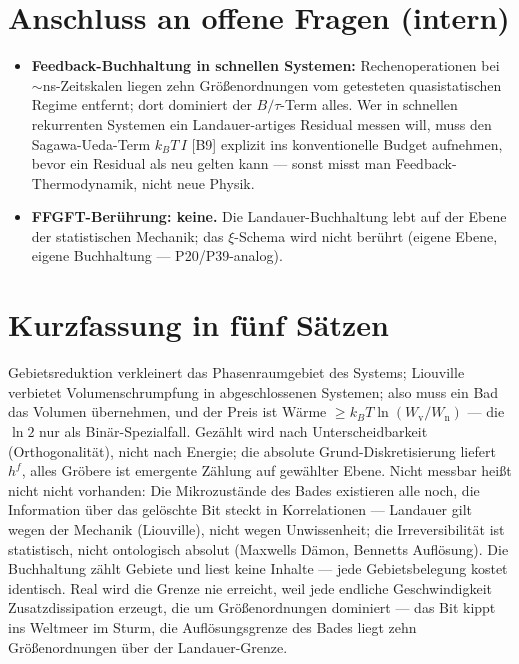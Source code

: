 \section{Anschluss an offene Fragen (intern)}

\begin{itemize}[leftmargin=1.4em,itemsep=0.35em]
  \item \textbf{Feedback-Buchhaltung in schnellen Systemen:} Rechenoperationen bei
        ${\sim}$ns-Zeitskalen liegen zehn Größenordnungen vom getesteten
        quasistatischen Regime entfernt; dort dominiert der $B/\tau$-Term alles.
        Wer in schnellen rekurrenten Systemen ein Landauer-artiges Residual messen
        will, muss den Sagawa-Ueda-Term $k_B T\,I$ [B9] explizit ins konventionelle
        Budget aufnehmen, bevor ein Residual als neu gelten kann --- sonst misst
        man Feedback-Thermodynamik, nicht neue Physik.
  \item \textbf{FFGFT-Berührung: keine.} Die Landauer-Buchhaltung lebt auf der
        Ebene der statistischen Mechanik; das $\xi$-Schema wird nicht berührt
        (eigene Ebene, eigene Buchhaltung --- P20/P39-analog).
\end{itemize}

\section{Kurzfassung in fünf Sätzen}

Gebietsreduktion verkleinert das Phasenraumgebiet des Systems; Liouville verbietet
Volumenschrumpfung in abgeschlossenen Systemen; also muss ein Bad das Volumen
übernehmen, und der Preis ist Wärme
$\ge k_B T \ln(W_{\text{v}}/W_{\text{n}})$ --- die $\ln 2$ nur als
Binär-Spezialfall. Gezählt wird nach Unterscheidbarkeit (Orthogonalität), nicht
nach Energie; die absolute Grund-Diskretisierung liefert $h^f$, alles Gröbere ist
emergente Zählung auf gewählter Ebene. Nicht messbar heißt nicht nicht vorhanden:
Die Mikrozustände des Bades existieren alle noch, die Information über das
gelöschte Bit steckt in Korrelationen --- Landauer gilt wegen der Mechanik
(Liouville), nicht wegen Unwissenheit; die Irreversibilität ist statistisch, nicht
ontologisch absolut (Maxwells Dämon, Bennetts Auflösung). Die Buchhaltung zählt
Gebiete und liest keine Inhalte --- jede Gebietsbelegung kostet identisch. Real
wird die Grenze nie erreicht, weil jede endliche Geschwindigkeit
Zusatzdissipation erzeugt, die um Größenordnungen dominiert --- das Bit kippt ins
Weltmeer im Sturm, die Auflösungsgrenze des Bades liegt zehn Größenordnungen über
der Landauer-Grenze.


